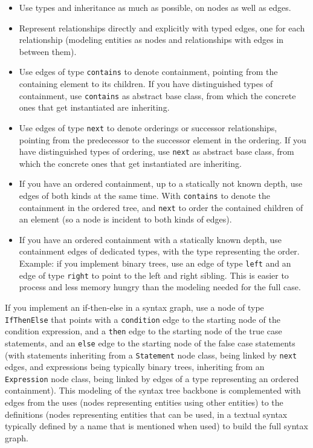 \begin{itemize}
  \item Use types and inheritance as much as possible, on nodes as well as edges. 
	\item Represent relationships directly and explicitly with typed edges, one for each relationship (modeling entities as nodes and relationships with edges in between them).
	\item Use edges of type \texttt{contains} to denote containment, pointing from the containing element to its children. If you have distinguished types of containment, use \texttt{contains} as abstract base class, from which the concrete ones that get instantiated are inheriting.
	\item Use edges of type \texttt{next} to denote orderings or successor relationships, pointing from the predecessor to the successor element in the ordering. If you have distinguished types of ordering, use \texttt{next} as abstract base class, from which the concrete ones that get instantiated are inheriting.
	\item If you have an ordered containment, up to a statically not known depth, use edges of both kinds at the same time. With \texttt{contains} to denote the containment in the ordered tree, and \texttt{next} to order the contained children of an element (so a node is incident to both kinds of edges).
	\item If you have an ordered containment with a statically known depth, use containment edges of dedicated types, with the type representing the order. Example: if you implement binary trees, use an edge of type \texttt{left} and an edge of type \texttt{right} to point to the left and right sibling. This is easier to process and less memory hungry than the modeling needed for the full case.
\end{itemize}

\begin{note}
If you implement an if-then-else in a syntax graph, use a node of type \texttt{IfThenElse} that points with a \texttt{condition} edge to the starting node of the condition expression, and a \texttt{then} edge to the starting node of the true case statements, and an \texttt{else} edge to the starting node of the false case statements (with statements inheriting from a \texttt{Statement} node class, being linked by \texttt{next} edges, and expressions being typically binary trees, inheriting from an \texttt{Expression} node class, being linked by edges of a type representing an ordered containment). This modeling of the syntax tree backbone is complemented with edges from the uses (nodes representing entities using other entities) to the definitions (nodes representing entities that can be used, in a textual syntax typically defined by a name that is mentioned when used) to build the full syntax graph.
\end{note}

